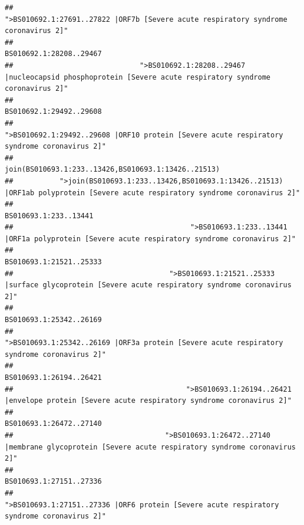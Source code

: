 \documentclass[
]{article}
\begin{document}
\begin{verbatim}
##                                                    ">BS010692.1:27691..27822 |ORF7b [Severe acute respiratory syndrome coronavirus 2]" 
##                                                                                                                BS010692.1:28208..29467 
##                              ">BS010692.1:28208..29467 |nucleocapsid phosphoprotein [Severe acute respiratory syndrome coronavirus 2]" 
##                                                                                                                BS010692.1:29492..29608 
##                                            ">BS010692.1:29492..29608 |ORF10 protein [Severe acute respiratory syndrome coronavirus 2]" 
##                                                                                    join(BS010693.1:233..13426,BS010693.1:13426..21513) 
##           ">join(BS010693.1:233..13426,BS010693.1:13426..21513) |ORF1ab polyprotein [Severe acute respiratory syndrome coronavirus 2]" 
##                                                                                                                  BS010693.1:233..13441 
##                                          ">BS010693.1:233..13441 |ORF1a polyprotein [Severe acute respiratory syndrome coronavirus 2]" 
##                                                                                                                BS010693.1:21521..25333 
##                                     ">BS010693.1:21521..25333 |surface glycoprotein [Severe acute respiratory syndrome coronavirus 2]" 
##                                                                                                                BS010693.1:25342..26169 
##                                            ">BS010693.1:25342..26169 |ORF3a protein [Severe acute respiratory syndrome coronavirus 2]" 
##                                                                                                                BS010693.1:26194..26421 
##                                         ">BS010693.1:26194..26421 |envelope protein [Severe acute respiratory syndrome coronavirus 2]" 
##                                                                                                                BS010693.1:26472..27140 
##                                    ">BS010693.1:26472..27140 |membrane glycoprotein [Severe acute respiratory syndrome coronavirus 2]" 
##                                                                                                                BS010693.1:27151..27336 
##                                             ">BS010693.1:27151..27336 |ORF6 protein [Severe acute respiratory syndrome coronavirus 2]" 

\end{verbatim}
\end{document}
